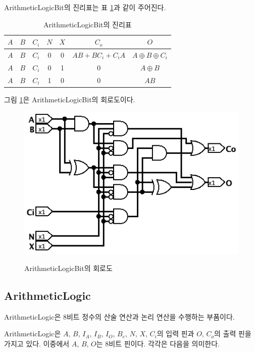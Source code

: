 \documentclass{article}
\renewcommand{\figurename}{그림}
\renewcommand{\tablename}{표}
\begin{document}
ArithmeticLogicBit의 진리표는 \tablename{} \ref{tab:alb}과 같이 주어진다.

\begin{table}[h]
    \centering
    \begin{tabular}{ccccc|cc}
        $A$ & $B$ & $C_i$ & $N$ & $X$ & $C_o$ & $O$ \\
        \hline
        $A$ & $B$ & $C_i$ &  0 &  0 & $AB + BC_i + C_iA$ & $A \oplus B \oplus C_i$ \\
        $A$ & $B$ & $C_i$ &  0 &  1 &  0 & $A \oplus B$ \\
        $A$ & $B$ & $C_i$ &  1 &  0 &  0 & $AB$ \\
    \end{tabular}
    \caption{ArithmeticLogicBit의 진리표}
    \label{tab:alb}
\end{table}

\figurename{} \ref{fig:alb}은 ArithmeticLogicBit의 회로도이다.

\begin{figure}[h]
    \centering
    \includegraphics[scale=0.5]{ArithmeticLogicBit} \\
    \caption{ArithmeticLogicBit의 회로도}
    \label{fig:alb}
\end{figure}

\subsection{ArithmeticLogic}

ArithmeticLogic은 8비트 정수의 산술 연산과 논리 연산을 수행하는 부품이다.

ArithmeticLogic은 $A$, $B$, $I_A$, $I_B$, $I_O$, $B_e$, $N$, $X$, $C_i$의 입력 핀과
$O$, $C_o$의 출력 핀을 가지고 있다.
이중에서 $A$, $B$, $O$는 8비트 핀이다.
각각은 다음을 의미한다.
\end{document}
